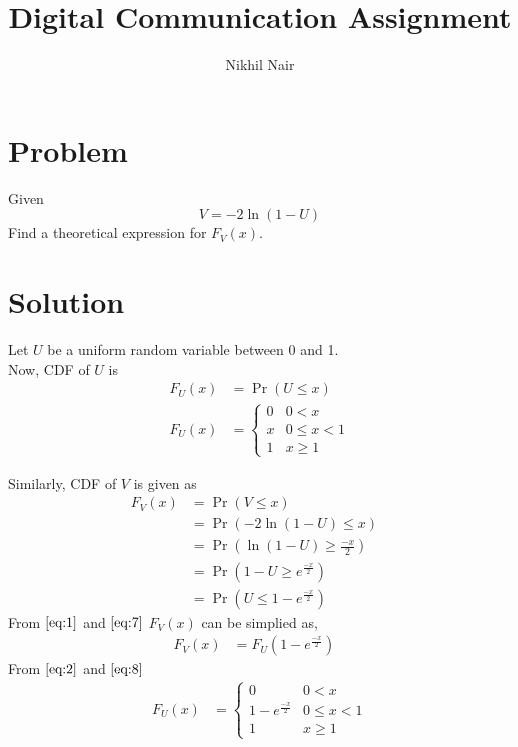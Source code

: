 \documentclass[journal,12pt,twocolumn]{IEEEtran}
\title{\mytitle}
\title{
Digital Communication Assignment
}
\author{Nikhil Nair}
\providecommand{\pr}[1]{\ensuremath{\Pr\left(#1\right)}}
\providecommand{\brak}[1]{\ensuremath{\left(#1\right)}}
\begin{document}
\maketitle
\bigskip


\section{\textbf{Problem }}
Given 
\begin{equation}
V = -2\ln\brak{1-U}  \nonumber
\end{equation}
Find a theoretical expression for $F_V (x)$.

\section{\textbf{Solution }}
Let $U$ be a uniform random variable between 0 and 1.
\\
Now, CDF of $U$ is 
\begin{align}
F_{U}(x) &= \pr{U \le x}   \label{eq:1}
\\
F_{U}(x)  &= 
\begin{cases}
0 & 0 < x 
\\
x & 0 \le x < 1
\\ 
1 &  x \ge 1                \label{eq:2}
\end{cases}
\end{align}

Similarly, CDF of $V$ is given as
\begin{align}
F_{V}(x) &= \pr{V \le x}&
\\
&= \pr{-2\ln\brak{1-U} \le x}&
\\
&= \pr{\ln\brak{1-U} \ge \frac{-x}{2}}&
\\
&= \pr{1-U \ge e^{\frac{-x}{2}}}&
\\
&= \pr{U \le 1-e^{\frac{-x}{2}}}&  \label{eq:7}
\end{align}
From $\eqref{eq:1}$ and $\eqref{eq:7}$ $F_V (x)$ can be simplied as,
\begin{align}
F_{V}(x) &= F_{U}(1-e^{\frac{-x}{2}})&    \label{eq:8}
\end{align}
From $\eqref{eq:2}$ and $\eqref{eq:8}$
\begin{align}
F_{U}(x)  &= 
\begin{cases}
0 & 0 < x 
\\
1-e^{\frac{-x}{2}} & 0 \le x < 1
\\ 
1 &  x \ge 1                
\end{cases}
\end{align}
\end{document}
